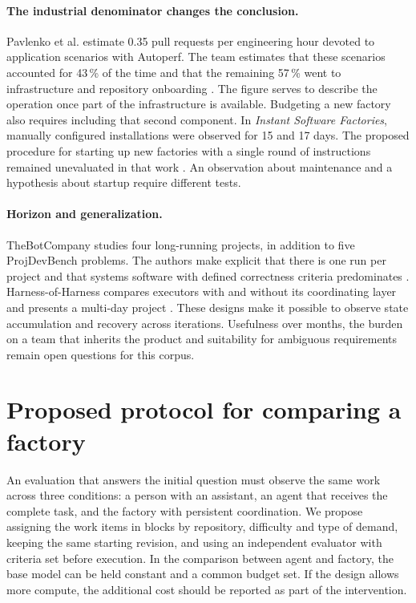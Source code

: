 \documentclass[11pt,a4paper]{article}
\begin{document}
\paragraph{The industrial denominator changes the conclusion.}
Pavlenko et al. estimate 0.35 pull requests per engineering hour devoted to application scenarios with Autoperf. The team estimates that these scenarios accounted for 43\,\% of the time and that the remaining 57\,\% went to infrastructure and repository onboarding \citep{data}. The figure serves to describe the operation once part of the infrastructure is available. Budgeting a new factory also requires including that second component. In \emph{Instant Software Factories}, manually configured installations were observed for 15 and 17 days. The proposed procedure for starting up new factories with a single round of instructions remained unevaluated in that work \citep{instant}. An observation about maintenance and a hypothesis about startup require different tests.

\paragraph{Horizon and generalization.}
TheBotCompany studies four long-running projects, in addition to five ProjDevBench problems. The authors make explicit that there is one run per project and that systems software with defined correctness criteria predominates \citep[sections 4.2 and 4.4]{bot}. Harness-of-Harness compares executors with and without its coordinating layer and presents a multi-day project \citep{hoh}. These designs make it possible to observe state accumulation and recovery across iterations. Usefulness over months, the burden on a team that inherits the product and suitability for ambiguous requirements remain open questions for this corpus.

\section{Proposed protocol for comparing a factory}
An evaluation that answers the initial question must observe the same work across three conditions: a person with an assistant, an agent that receives the complete task, and the factory with persistent coordination. We propose assigning the work items in blocks by repository, difficulty and type of demand, keeping the same starting revision, and using an independent evaluator with criteria set before execution. In the comparison between agent and factory, the base model can be held constant and a common budget set. If the design allows more compute, the additional cost should be reported as part of the intervention.
\end{document}
